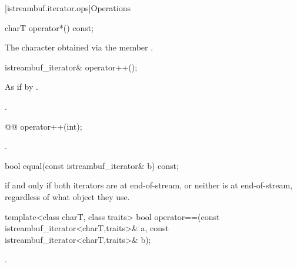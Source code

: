 [istreambuf.iterator.ops]{Operations}

%
\begin{itemdecl}
charT operator*() const;
\end{itemdecl}

\begin{itemdescr}
\pnum
\returns
The character obtained via the
member
.
\end{itemdescr}

%
\begin{itemdecl}
istreambuf_iterator& operator++();
\end{itemdecl}

\begin{itemdescr}
\pnum
\effects
As if by .

\pnum
\returns
{}.
\end{itemdescr}

%
\begin{itemdecl}
@@ operator++(int);
\end{itemdecl}

\begin{itemdescr}
\pnum
\returns
{}.
\end{itemdescr}

%
\begin{itemdecl}
bool equal(const istreambuf_iterator& b) const;
\end{itemdecl}

\begin{itemdescr}
\pnum
\returns
{}
if and only if both iterators are at end-of-stream,
or neither is at end-of-stream, regardless of what
object they use.
\end{itemdescr}

%
\begin{itemdecl}
template<class charT, class traits>
  bool operator==(const istreambuf_iterator<charT,traits>& a,
                  const istreambuf_iterator<charT,traits>& b);
\end{itemdecl}

\begin{itemdescr}
\pnum
\returns
{}.
\end{itemdescr}

